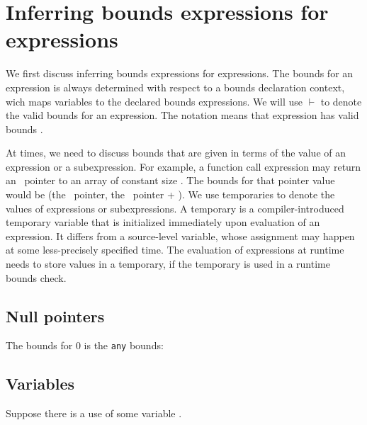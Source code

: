 \section{Inferring bounds expressions for expressions}
\label{section:inferring-expression-bounds}

We first discuss inferring bounds expressions for expressions. The bounds for an
expression is always determined with respect to a bounds
declaration context, wich maps variables to the declared bounds
expressions.  We will use $\vdash$ to denote the
valid bounds for an expression. The notation 
means that expression  has valid bounds .

At times, we need to discuss bounds that are given in terms of the value
of an expression or a subexpression.   For example, a function call expression may
return an \arrayptr\ pointer to an array of constant size
. The bounds for that pointer value would be (the
\arrayptr\ pointer, the \arrayptr\ pointer +
). We use temporaries to denote the values
of expressions or subexpressions.   A temporary is a compiler-introduced
temporary variable that is initialized immediately upon evaluation of an
expression.   It differs from a source-level variable, whose assignment
may happen at some less-precisely specified time.   The evaluation of
expressions at runtime needs to store values in a temporary, 
if the temporary is used in a runtime
bounds check.

\subsection{Null pointers}

The bounds for 0 is the \lstinline|any| bounds:


\subsection{Variables}
\label{section:checking-variables}

Suppose there is a use of some variable .

